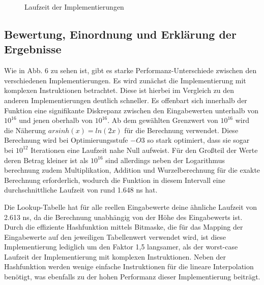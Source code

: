 \documentclass[course=erap] {aspdoc}
\begin{document}
{\begin{figure}
        \caption{Laufzeit der Implementierungen}
    \end{figure}

    \subsection{Bewertung, Einordnung und Erklärung der Ergebnisse}\label{subsec:bewertung-einordnung-und-erklarung-der-ergebnisse}

    Wie in Abb. 6 zu sehen ist, gibt es starke Performanz-Unterschiede zwischen den verschiedenen Implementierungen.
    Es wird zunächst die Implementierung mit komplexen Instruktionen betrachtet.
    Diese ist hierbei im Vergleich zu den anderen Implementierungen deutlich schneller.
    Es offenbart sich innerhalb der Funktion eine signifikante Diskrepanz zwischen den Eingabewerten unterhalb von $10^{16}$ und jenen oberhalb von $10^{16}$.
    Ab dem gewählten Grenzwert von $10^{16}$ wird die Näherung $arsinh(x) = ln(2x)$ für die Berechnung verwendet.
    Diese Berechnung wird bei Optimierungsstufe $-O3$ so stark optimiert, dass sie sogar bei $10^{12}$ Iterationen eine Laufzeit nahe Null aufweist.
    Für den Großteil der Werte deren Betrag kleiner ist als $10^{16}$ sind allerdings neben der Logarithmus berechnung zudem Multiplikation, Addition und Wurzelberechnung für die exakte Berechnung erforderlich, wodurch die Funktion in diesem Intervall eine durchschnittliche Laufzeit von rund 1.648 ns hat.

    Die Lookup-Tabelle hat für alle reellen Eingabewerte deine ähnliche Laufzeit von 2.613 ns, da die Berechnung unabhängig von der Höhe des Eingabewerts ist.
    Durch die effiziente Hashfunktion mittels Bitmaske, die für das Mapping der Eingabewerte auf den jeweiligen Tabellenwert verwendet wird, ist diese Implementierung lediglich um den Faktor 1,5 langsamer, als der worst-case Laufzeit der Implementierung mit komplexen Instruktionen.
    Neben der Hashfunktion werden wenige einfache Instruktionen für die lineare Interpolation benötigt, was ebenfalls zu der hohen Performanz dieser Implementierung beiträgt.

}
\end{document}
